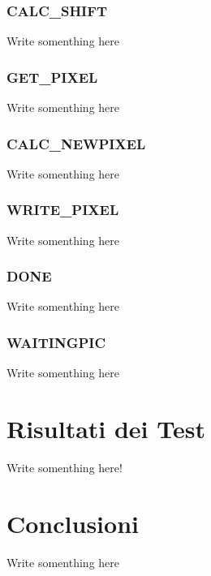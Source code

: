 \documentclass{article}
\begin{document}
\subsubsection{CALC\_SHIFT}%
Write somenthing here

\subsubsection{GET\_PIXEL}%
Write somenthing here

\subsubsection{CALC\_NEWPIXEL}%
Write somenthing here

\subsubsection{WRITE\_PIXEL}%
Write somenthing here

\subsubsection{DONE}%
Write somenthing here

\subsubsection{WAITINGPIC}%
Write somenthing here

\section{Risultati dei Test}%
Write somenthing here!

\section{Conclusioni}%
Write somenthing here
\end{document}
